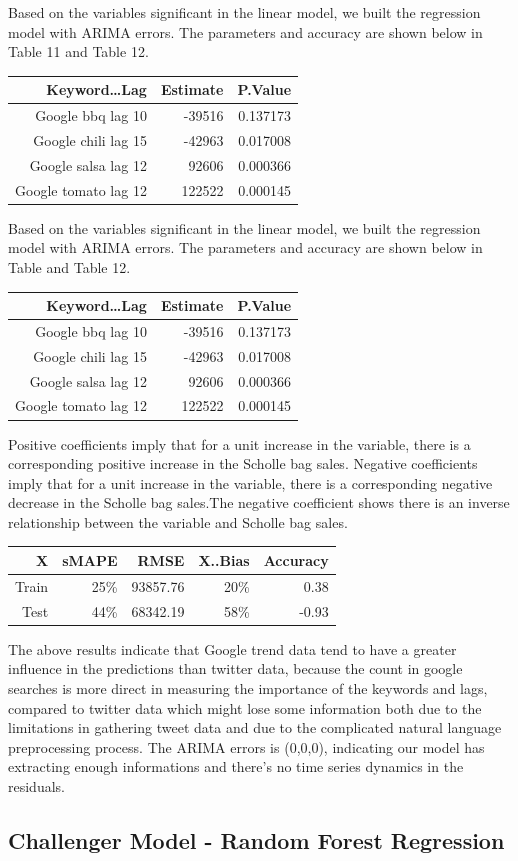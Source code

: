 \documentclass[12pt,oneside]{chicagocapstone}
\begin{document}
Based on the variables significant in the linear model, we built the
regression model with ARIMA errors. The parameters and accuracy are
shown below in Table 11 and Table 12.
\begin{longtable}[]{@{}rrr@{}}
\toprule
Keyword\ldots{}Lag & Estimate & P.Value\tabularnewline
\midrule
\endhead
Google bbq lag 10 & -39516 & 0.137173\tabularnewline
Google chili lag 15 & -42963 & 0.017008\tabularnewline
Google salsa lag 12 & 92606 & 0.000366\tabularnewline
Google tomato lag 12 & 122522 & 0.000145\tabularnewline
\bottomrule
\end{longtable}
Based on the variables significant in the linear model, we built the
regression model with ARIMA errors. The parameters and accuracy are
shown below in Table and Table 12.
\begin{longtable}[]{@{}rrr@{}}
\toprule
Keyword\ldots{}Lag & Estimate & P.Value\tabularnewline
\midrule
\endhead
Google bbq lag 10 & -39516 & 0.137173\tabularnewline
Google chili lag 15 & -42963 & 0.017008\tabularnewline
Google salsa lag 12 & 92606 & 0.000366\tabularnewline
Google tomato lag 12 & 122522 & 0.000145\tabularnewline
\bottomrule
\end{longtable}
Positive coefficients imply that for a unit increase in the variable,
there is a corresponding positive increase in the Scholle bag sales.
Negative coefficients imply that for a unit increase in the variable,
there is a corresponding negative decrease in the Scholle bag sales.The
negative coefficient shows there is an inverse relationship between the
variable and Scholle bag sales.
\begin{longtable}[]{@{}rrrrr@{}}
\toprule
X & sMAPE & RMSE & X..Bias & Accuracy\tabularnewline
\midrule
\endhead
Train & 25\% & 93857.76 & 20\% & 0.38\tabularnewline
Test & 44\% & 68342.19 & 58\% & -0.93\tabularnewline
\bottomrule
\end{longtable}
The above results indicate that Google trend data tend to have a greater
influence in the predictions than twitter data, because the count in
google searches is more direct in measuring the importance of the
keywords and lags, compared to twitter data which might lose some
information both due to the limitations in gathering tweet data and due
to the complicated natural language preprocessing process. The ARIMA
errors is (0,0,0), indicating our model has extracting enough
informations and there's no time series dynamics in the residuals.

\subsection*{Challenger Model - Random Forest
Regression}\label{challenger-model---random-forest-regression}
\end{document}
